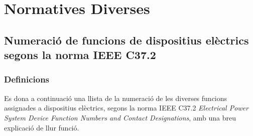 \chapter{Normatives Diverses}\label{sec:ch-normes}

\section{Numeració de funcions de dispositius elèctrics segons la norma IEEE C37.2}\label{sec:ieee-c37-2}

\subsection{Definicions}

Es dona a continuació una llista de la numeració de les diverses funcions assignades a dispositius
elèctrics, segons la norma IEEE C37.2 \textit{Electrical Power System Device Function Numbers and Contact Designations}, amb una breu
explicació de llur funció.

